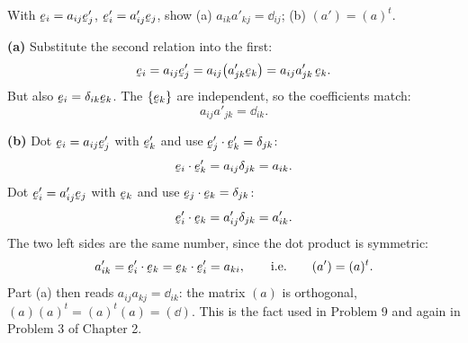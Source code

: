 \begin{problem}
With $\be_i=a_{ij}\be'_j$, $\be'_i=a'_{ij}\be_j$, show (a)
$a_{ik}a'_{kj}=\dd_{ij}$; (b) $(a')=(a)^{t}$.
\end{problem}
\begin{solution}
\textbf{(a)} Substitute the second relation into the first:
\[
   \be_i=a_{ij}\be'_j=a_{ij}\big(a'_{jk}\be_k\big)=a_{ij}a'_{jk}\,\be_k .
\]
But also $\be_i=\dd_{ik}\be_k$. The $\{\be_k\}$ are independent, so the
coefficients match:
\[
   a_{ij}a'_{jk}=\dd_{ik}.
\]

\textbf{(b)} Dot $\be_i=a_{ij}\be'_j$ with $\be'_k$ and use
$\ip{\be'_j}{\be'_k}=\dd_{jk}$:
\[
   \ip{\be_i}{\be'_k}=a_{ij}\dd_{jk}=a_{ik}.
\]
Dot $\be'_i=a'_{ij}\be_j$ with $\be_k$ and use $\ip{\be_j}{\be_k}=\dd_{jk}$:
\[
   \ip{\be'_i}{\be_k}=a'_{ij}\dd_{jk}=a'_{ik}.
\]
The two left sides are the same number, since the dot product is
symmetric:
\[
   a'_{ik}=\ip{\be'_i}{\be_k}=\ip{\be_k}{\be'_i}=a_{ki},
   \qquad\text{i.e.}\qquad (a')=(a)^{t}.
\]
Part (a) then reads $a_{ij}a_{kj}=\dd_{ik}$: the matrix $(a)$ is
orthogonal, $(a)(a)^{t}=(a)^{t}(a)=(\dd)$. This is the fact used in
Problem 9 and again in Problem 3 of Chapter 2.
\end{solution}

